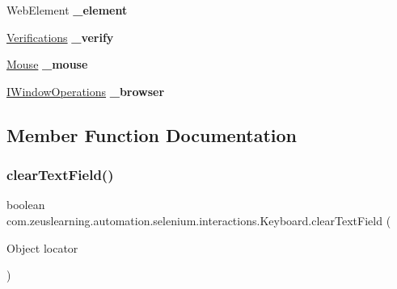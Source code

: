 \begin{DoxyCompactItemize}
Web\+Element {\bfseries \+\_\+element}
\item 
\hypertarget{classcom_1_1zeuslearning_1_1automation_1_1selenium_1_1interactions_1_1Keyboard_a6120f92af93919c8bc0dcb8448c8dcdb}{}\label{classcom_1_1zeuslearning_1_1automation_1_1selenium_1_1interactions_1_1Keyboard_a6120f92af93919c8bc0dcb8448c8dcdb} 
\hyperlink{classcom_1_1zeuslearning_1_1automation_1_1selenium_1_1interactions_1_1Verifications}{Verifications} {\bfseries \+\_\+verify}
\item 
\hypertarget{classcom_1_1zeuslearning_1_1automation_1_1selenium_1_1interactions_1_1Keyboard_adca733ea8f3973e451c5d1da530ce5b8}{}\label{classcom_1_1zeuslearning_1_1automation_1_1selenium_1_1interactions_1_1Keyboard_adca733ea8f3973e451c5d1da530ce5b8} 
\hyperlink{classcom_1_1zeuslearning_1_1automation_1_1selenium_1_1interactions_1_1Mouse}{Mouse} {\bfseries \+\_\+mouse}
\item 
\hypertarget{classcom_1_1zeuslearning_1_1automation_1_1selenium_1_1interactions_1_1Keyboard_a3ca01eb33f24196a13b82958f01d211c}{}\label{classcom_1_1zeuslearning_1_1automation_1_1selenium_1_1interactions_1_1Keyboard_a3ca01eb33f24196a13b82958f01d211c} 
\hyperlink{interfacecom_1_1zeuslearning_1_1automation_1_1interactions_1_1IWindowOperations}{I\+Window\+Operations} {\bfseries \+\_\+browser}
\end{DoxyCompactItemize}


\subsection{Member Function Documentation}
\hypertarget{classcom_1_1zeuslearning_1_1automation_1_1selenium_1_1interactions_1_1Keyboard_aa50940a7a030455246ba1c3ee3d62d85}{}\label{classcom_1_1zeuslearning_1_1automation_1_1selenium_1_1interactions_1_1Keyboard_aa50940a7a030455246ba1c3ee3d62d85} 
\subsubsection{\texorpdfstring{clear\+Text\+Field()}{clearTextField()}}
{\footnotesize\ttfamily boolean com.\+zeuslearning.\+automation.\+selenium.\+interactions.\+Keyboard.\+clear\+Text\+Field (\begin{DoxyParamCaption}\item[{Object}]{locator }\end{DoxyParamCaption})\hspace{0.3cm}{\ttfamily [inline]}}

